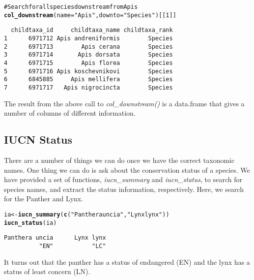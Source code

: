 \documentclass[10pt]{article}\usepackage{graphicx, color}
\makeatletter
\newcommand{\hlfunctioncall}[1]{\textcolor[rgb]{0.501960784313725,0,0.329411764705882}{\textbf{#1}}}%
\newcommand{\hlstring}[1]{\textcolor[rgb]{0.6,0.6,1}{#1}}%
\newcommand{\hlcomment}[1]{\textcolor[rgb]{0.180392156862745,0.6,0.341176470588235}{#1}}%
\newenvironment{kframe}{%
 \def\at@end@of@kframe{}%
 \ifinner\ifhmode%
  \def\at@end@of@kframe{\end{minipage}}%
  \begin{minipage}{\columnwidth}%
 \fi\fi%
 \def\FrameCommand##1{\hskip\@totalleftmargin \hskip-\fboxsep
 \colorbox{shadecolor}{##1}\hskip-\fboxsep
     \hskip-\linewidth \hskip-\@totalleftmargin \hskip\columnwidth}%
 \MakeFramed {\advance\hsize-\width
   \@totalleftmargin\z@ \linewidth\hsize
   \@setminipage}}%
 {\par\unskip\endMakeFramed%
 \at@end@of@kframe}
\newenvironment{knitrout}{}{} %
\makeatother
\begin{document}
\begin{knitrout}
\color{fgcolor}\begin{kframe}
\begin{alltt}
\hlcomment{# Search for all species downstream from Apis}
\hlfunctioncall{col_downstream}(name = \hlstring{"Apis"}, downto = \hlstring{"Species"})[[1]]
\end{alltt}
\begin{verbatim}
  childtaxa_id     childtaxa_name childtaxa_rank
1      6971712 Apis andreniformis        Species
2      6971713        Apis cerana        Species
3      6971714       Apis dorsata        Species
4      6971715        Apis florea        Species
5      6971716 Apis koschevnikovi        Species
6      6845885     Apis mellifera        Species
7      6971717   Apis nigrocincta        Species
\end{verbatim}
\end{kframe}
\end{knitrout}


The result from the above call to \emph{col\_downstream()} is a data.frame that gives a number of columns of different information. 

\subsection*{IUCN Status}
There are a number of things we can do once we have the correct taxonomic names. One thing we can do is ask about the conservation status of a species. We have provided a set of functions, \emph{iucn\_summary} and \emph{iucn\_status}, to search for species names, and extract the status information, respectively. Here, we search for the Panther and Lynx.  

\begin{knitrout}
\color{fgcolor}\begin{kframe}
\begin{alltt}
ia <- \hlfunctioncall{iucn_summary}(\hlfunctioncall{c}(\hlstring{"Panthera uncia"}, \hlstring{"Lynx lynx"}))
\hlfunctioncall{iucn_status}(ia)
\end{alltt}
\begin{verbatim}
Panthera uncia      Lynx lynx 
          "EN"           "LC" 
\end{verbatim}
\end{kframe}
\end{knitrout}


It turns out that the panther has a status of endangered (EN) and the lynx has a status of least concern (LN).
\end{document}
